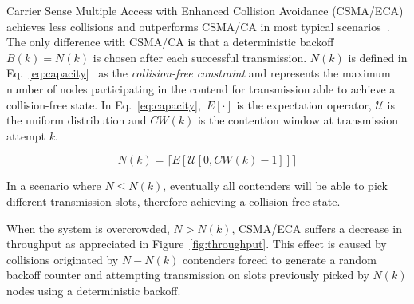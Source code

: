 Carrier Sense Multiple Access with Enhanced Collision Avoidance (CSMA/ECA) achieves less collisions and outperforms CSMA/CA in most typical scenarios~\cite{CSMA_ECA}. The only difference with CSMA/CA is that a deterministic backoff~$B(k) = N(k)$ is chosen after each successful transmission. $N(k)$ is defined in Eq.~\ref{eq:capacity}~\cite{CSMA_ECA} as the \emph{collision-free constraint} and represents the maximum number of nodes participating in the contend for transmission able to achieve a collision-free state. In Eq.~\ref{eq:capacity},~$E[\cdotp]$ is the expectation operator, $\mathcal{U}$ is the uniform distribution and $CW(k)$ is the contention window at transmission attempt $k$.



\begin{equation} \label{eq:capacity}	
	N(k) = \lceil{E[\mathcal{U}[0, CW(k) - 1]]}\rceil
\end{equation}

In a scenario where $N \leq N(k)$, eventually all contenders will be able to pick different transmission slots, therefore achieving a collision-free state.

When the system is overcrowded, $N>N(k)$, CSMA/ECA suffers a decrease in throughput as appreciated in Figure~\ref{fig:throughput}. This effect is caused by collisions originated by $N-N(k)$ contenders forced to generate a random backoff counter and attempting transmission on slots previously picked by $N(k)$ nodes using a deterministic backoff.


